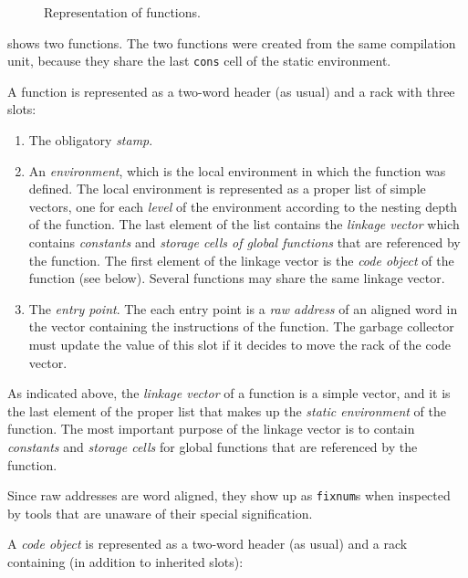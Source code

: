 \begin{figure}
\begin{center}
\end{center}
\caption{\label{fig-function-representation}
Representation of functions.}
\end{figure}

 shows two functions.  The two
functions were created from the same compilation unit, because they
share the last \texttt{cons} cell of the static environment.

A function is represented as a two-word header (as usual) and a
rack with three slots:

\begin{enumerate}
\item The obligatory \emph{stamp}.
\item An \emph{environment}, which is the local environment in which
  the function was defined.  The local environment is represented as a
  proper list of simple vectors, one for each \emph{level} of the
  environment according to the nesting depth of the function.  The
  last element of the list contains the \emph{linkage vector} which
  contains \emph{constants} and \emph{storage cells of global
    functions} that are referenced by the function.  The first element
  of the linkage vector is the \emph{code object} of the function (see
  below).  Several functions may share the same linkage vector.
\item The \emph{entry point}.  The each entry
  point is a \emph{raw address} of an aligned word in the vector
  containing the instructions of the function.  The garbage collector
  must update the value of this slot if it decides to move the
  rack of the code vector.
\end{enumerate}

As indicated above, the \emph{linkage vector} of a function is a
simple vector, and it is the last element of the proper list that
makes up the \emph{static environment} of the function.  The most
important purpose of the linkage vector is to contain \emph{constants}
and \emph{storage cells} for global functions that are referenced by
the function.

Since raw addresses are word aligned, they show up as \texttt{fixnum}s
when inspected by tools that are unaware of their special
signification.

A \emph{code object} is represented as a two-word header (as usual)
and a rack containing (in addition to inherited slots):

